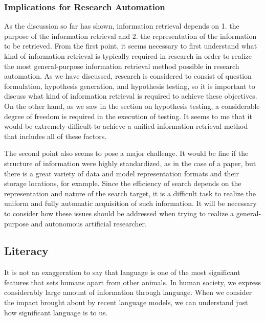 \documentclass{book}
\begin{document}
\subsubsection{Implications for Research Automation}
As the discussion so far has shown, information retrieval depends on 1. the purpose of the information retrieval and 2. the representation of the information to be retrieved. From the first point, it seems necessary to first understand what kind of information retrieval is typically required in research in order to realize the most general-purpose information retrieval method possible in research automation. As we have discussed, research is considered to consist of question formulation, hypothesis generation, and hypothesis testing, so it is important to discuss what kind of information retrieval is required to achieve these objectives. On the other hand, as we saw in the section on hypothesis testing, a considerable degree of freedom is required in the execution of testing. It seems to me that it would be extremely difficult to achieve a unified information retrieval method that includes all of these factors.

The second point also seems to pose a major challenge. It would be fine if the structure of information were highly standardized, as in the case of a paper, but there is a great variety of data and model representation formats and their storage locations, for example. Since the efficiency of search depends on the representation and nature of the search target, it is a difficult task to realize the uniform and fully automatic acquisition of such information. It will be necessary to consider how these issues should be addressed when trying to realize a general-purpose and autonomous artificial researcher.



\subsection{Literacy}

It is not an exaggeration to say that language is one of the most significant features that sets humans apart from other animals. In human society, we express considerably large amount of information through language. When we consider the impact brought about by recent language models, we can understand just how significant language is to us.
\end{document}
